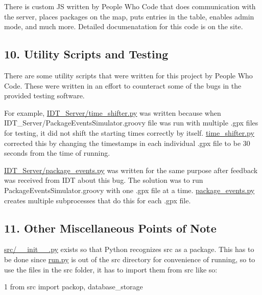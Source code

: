 There is custom JS written by People Who Code that does communication with the server, places packages on the map, puts entries in the table, enables admin mode, and much more. Detailed documenatation for this code is on the site.

\subsection*{10. Utility Scripts and Testing}

There are some utility scripts that were written for this project by People Who Code. These were written in an effort to counteract some of the bugs in the provided testing software.

For example, {\ttfamily \hyperlink{time__shifter_8py}{I\+D\+T\+\_\+\+Server/time\+\_\+shifter.\+py}} was written because when {\ttfamily I\+D\+T\+\_\+\+Server/\+Package\+Events\+Simulator.\+groovy} file was run with multiple {\ttfamily .gpx} files for testing, it did not shift the starting times correctly by itself. {\ttfamily \hyperlink{time__shifter_8py}{time\+\_\+shifter.\+py}} corrected this by changing the timestamps in each individual {\ttfamily .gpx} file to be 30 seconds from the time of running.

{\ttfamily \hyperlink{package__events_8py}{I\+D\+T\+\_\+\+Server/package\+\_\+events.\+py}} was written for the same purpose after feedback was received from I\+DT about this bug. The solution was to run {\ttfamily Package\+Events\+Simulator.\+groovy} with one {\ttfamily .gpx} file at a time. {\ttfamily \hyperlink{package__events_8py}{package\+\_\+events.\+py}} creates multiple subprocesses that do this for each {\ttfamily .gpx} file.

\subsection*{11. Other Miscellaneous Points of Note}

{\ttfamily \hyperlink{____init_____8py}{src/\+\_\+\+\_\+init\+\_\+\+\_\+.\+py}} exists so that Python recognizes {\ttfamily src} as a package. This has to be done since {\ttfamily \hyperlink{run_8py}{run.\+py}} is out of the {\ttfamily src} directory for convenience of running, so to use the files in the {\ttfamily src} folder, it has to import them from {\ttfamily src} like so\+:


\begin{DoxyCode}
1 from src import packop, database\_storage
\end{DoxyCode}


